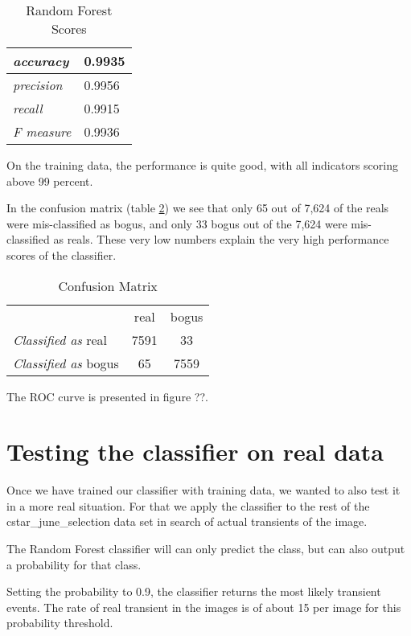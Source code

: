 \begin{table}
\centering
\begin{tabular}{| >{\itshape}l | l |}
  \hline
  accuracy & 0.9935 \\ \hline
  precision & 0.9956 \\ \hline
  recall & 0.9915 \\ \hline
  F measure & 0.9936 \\ \hline
\end{tabular}
\caption{Random Forest Scores}
\label{mlscores}
\end{table}

On the training data, the performance is quite good, with all indicators scoring above 99 percent.

In the confusion matrix (table \ref{mlconfusionmatrix}) we see that only 65 out of 7,624 of the reals were mis-classified as bogus, and only 33 bogus out of the 7,624 were mis-classified as reals. These very low numbers explain the very high performance scores of the classifier.

\begin{table}
\centering
\begin{tabular}{ l|c|c| }
\multicolumn{1}{r}{}
 &  \multicolumn{1}{c}{real}
 & \multicolumn{1}{c}{bogus} \\
\cline{2-3}
{\it Classified as} real & 7591 & 33 \\
\cline{2-3}
{\it Classified as} bogus & 65 & 7559 \\
\cline{2-3}
\end{tabular}
\caption{Confusion Matrix}
\label{mlconfusionmatrix}
\end{table}

The ROC curve is presented in figure ??.

\section{Testing the classifier on real data}

Once we have trained our classifier with training data, we wanted to also test it in a more real situation. For that we apply the classifier to the rest of the cstar\_june\_selection data set in search of actual transients of the image.

The Random Forest classifier will can only predict the class, but can also output a probability for that class.

Setting the probability to 0.9, the classifier returns the most likely transient events. The rate of real transient in the images is of about 15 per image for this probability threshold.

